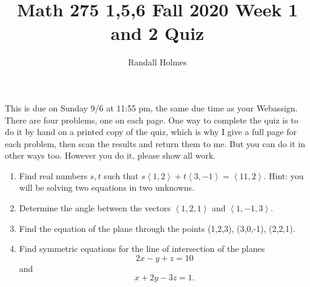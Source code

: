 \documentclass[12pt]{article}
\title {Math 275 1,5,6 Fall 2020 Week 1 and 2 Quiz}
\author{Randall Holmes}
\begin{document}
\maketitle

This is due on Sunday 9/6 at 11:55 pm, the same due time as your Webassign.   There are four problems, one on each page.  One way to complete the quiz is to do it by hand on a printed copy of  the quiz, which is why I give a full page for each problem, then scan the results and return them to me.  But you can do it in other ways too.  However you do it, please show all work.
\begin{enumerate}

\item  Find real numbers $s,t$ such that $s\left<1,2\right> + t\left<3,-1\right>= \left<11,2\right>$.  Hint:  you will be solving two equations in two unknowns.

\newpage

\item  Determine the angle between the vectors $\left<1,2,1\right>$ and $\left<1,-1,3\right>$.

\newpage

\item  Find the equation of the plane through the points (1,2,3),  (3,0,-1), (2,2,1).

\newpage

\item  Find symmetric equations for the line of intersection of the planes $$2x-y+z = 10$$ and $$x+2y-3z = 1.$$

\end{enumerate}
\end{document}
